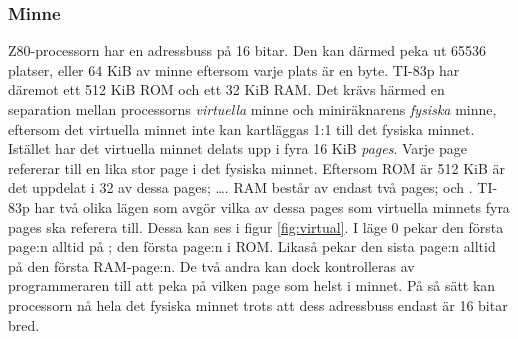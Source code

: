 \documentclass[main.tex]{subfiles}
\begin{document}
\subsubsection{Minne}
Z80-processorn har en adressbuss på 16 bitar. Den kan därmed peka ut 65536
platser, eller 64 KiB av minne eftersom varje plats är en byte. TI-83p har
däremot ett 512 KiB ROM och ett 32 KiB RAM. Det krävs härmed en separation
mellan processorns {\it virtuella} minne och miniräknarens {\it fysiska} minne,
eftersom det virtuella minnet inte kan kartläggas 1:1 till det fysiska minnet.
Istället har det virtuella minnet delats upp i fyra 16 KiB {\it pages}. Varje
page refererar till en lika stor page i det fysiska minnet. Eftersom ROM är 512
KiB är det uppdelat i 32 av dessa pages; \dots{}. RAM
består av endast två pages;  och . TI-83p har två olika
lägen som avgör vilka av dessa pages som virtuella minnets fyra pages ska
referera till. Dessa kan ses i figur \ref{fig:virtual}. I läge 0 pekar den
första page:n alltid på ; den första page:n i ROM. Likaså pekar
den sista page:n alltid på den första RAM-page:n. De två andra kan dock
kontrolleras av programmeraren till att peka på vilken page som helst i minnet.
På så sätt kan processorn nå hela det fysiska minnet trots att dess adressbuss
endast är 16 bitar bred.
\end{document}
